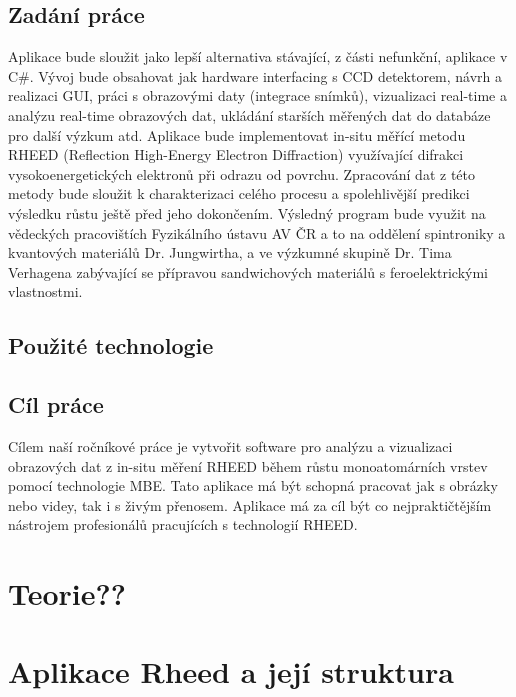 \documentclass{article}
\begin{document}
\subsection{Zadání práce}
    Aplikace bude sloužit jako lepší alternativa stávající, z části nefunkční, aplikace v C\#. Vývoj bude obsahovat jak hardware interfacing s CCD detektorem, návrh a realizaci GUI, práci s obrazovými daty (integrace snímků), vizualizaci real-time a analýzu real-time obrazových dat, ukládání starších měřených dat do databáze pro další výzkum atd. Aplikace bude implementovat in-situ měřící metodu RHEED (Reflection High-Energy Electron Diffraction) využívající difrakci vysokoenergetických elektronů při odrazu od povrchu. Zpracování dat z této metody bude sloužit k charakterizaci celého procesu a spolehlivější predikci výsledku růstu ještě před jeho dokončením. Výsledný program bude využit na vědeckých pracovištích Fyzikálního ústavu AV ČR a to na oddělení spintroniky a kvantových materiálů Dr. Jungwirtha, a ve výzkumné skupině Dr. Tima Verhagena zabývající se přípravou sandwichových materiálů s feroelektrickými vlastnostmi.
\subsection{Použité technologie}


\subsection{Cíl práce}
    Cílem naší ročníkové práce je vytvořit software pro analýzu a vizualizaci obrazových dat z in-situ  měření RHEED během růstu monoatomárních vrstev pomocí technologie MBE. Tato aplikace má být schopná pracovat jak s obrázky nebo videy, tak i s živým přenosem. Aplikace má za cíl být co nejpraktičtějším nástrojem profesionálů pracujících s technologií RHEED.

\section{Teorie??}

\section{Aplikace Rheed a její struktura}
    
\end{document}

